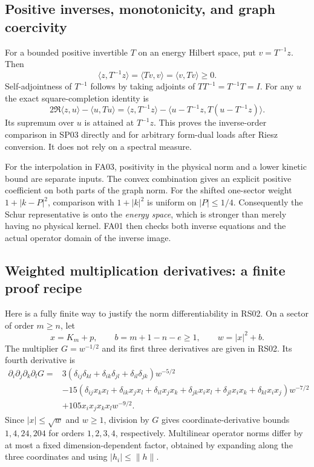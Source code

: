 \documentclass[11pt,a4paper]{article}
\theoremstyle{remark}\newtheorem{remark}[theorem]{Remark}
\newcommand{\ip}[2]{\langle #1,#2\rangle}\newcommand{\norm}[1]{\lVert #1\rVert}
\newcommand{\abs}[1]{\lvert #1\rvert}\newcommand{\rankone}[2]{\lvert #1\rangle\langle #2\rvert}
\begin{document}
\subsection{Positive inverses, monotonicity, and graph coercivity}
For a bounded positive invertible $T$ on an energy Hilbert space, put $v=T^{-1}z$. Then
\[
 \ip z{T^{-1}z}=\ip{Tv}v=\ip v{Tv}\geq0.
\]
Self-adjointness of $T^{-1}$ follows by taking adjoints of $TT^{-1}=T^{-1}T=I$. For any $u$ the exact square-completion identity is
\[
 2\Re\ip z u-\ip u{Tu}
 =\ip z{T^{-1}z}-\ip{u-T^{-1}z}{T(u-T^{-1}z)}.
\]
Its supremum over $u$ is attained at $T^{-1}z$. This proves the inverse-order comparison in SP03 directly and for arbitrary form-dual loads after Riesz conversion. It does not rely on a spectral measure.

For the interpolation in FA03, positivity in the physical norm and a lower kinetic bound are separate inputs. The convex combination gives an explicit positive coefficient on both parts of the graph norm. For the shifted one-sector weight $1+\abs{k-P}^2$, comparison with $1+\abs k^2$ is uniform on $\abs P\leq1/4$. Consequently the Schur representative is onto the \emph{energy space}, which is stronger than merely having no physical kernel. FA01 then checks both inverse equations and the actual operator domain of the inverse image.

\subsection{Weighted multiplication derivatives: a finite proof recipe}
Here is a fully finite way to justify the norm differentiability in RS02. On a sector of order $m\geq n$, let
\[
 x=K_m+p,\qquad b=m+1-n-e\geq1,\qquad w=\abs x^2+b.
\]
The multiplier $G=w^{-1/2}$ and its first three derivatives are given in RS02. Its fourth derivative is
\begin{align*}
 \partial_i\partial_j\partial_k\partial_lG
 ={}&3(\delta_{ij}\delta_{kl}+\delta_{ik}\delta_{jl}+\delta_{il}\delta_{jk})w^{-5/2}\\
 &-15(\delta_{ij}x_kx_l+\delta_{ik}x_jx_l+\delta_{il}x_jx_k
       +\delta_{jk}x_ix_l+\delta_{jl}x_ix_k+\delta_{kl}x_ix_j)w^{-7/2}\\
 &+105x_ix_jx_kx_lw^{-9/2}.
\end{align*}
Since $\abs x\leq\sqrt w$ and $w\geq1$, division by $G$ gives coordinate-derivative bounds $1,4,24,204$ for orders $1,2,3,4$, respectively. Multilinear operator norms differ by at most a fixed dimension-dependent factor, obtained by expanding along the three coordinates and using $\abs{h_i}\leq\norm h$.
\end{document}
